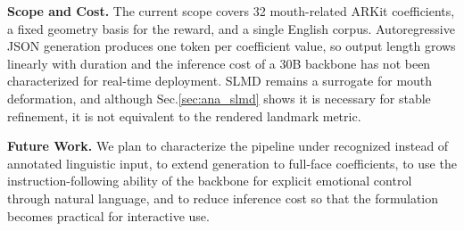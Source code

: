 \noindent\textbf{Scope and Cost.}\quad
The current scope covers 32 mouth-related ARKit coefficients, a fixed geometry basis for the reward, and a single English corpus. Autoregressive JSON generation produces one token per coefficient value, so output length grows linearly with duration and the inference cost of a 30B backbone has not been characterized for real-time deployment. SLMD remains a surrogate for mouth deformation, and although Sec.\ref{sec:ana_slmd} shows it is necessary for stable refinement, it is not equivalent to the rendered landmark metric.

\noindent\textbf{Future Work.}\quad
We plan to characterize the pipeline under recognized instead of annotated linguistic input, to extend generation to full-face coefficients, to use the instruction-following ability of the backbone for explicit emotional control through natural language, and to reduce inference cost so that the formulation becomes practical for interactive use.
